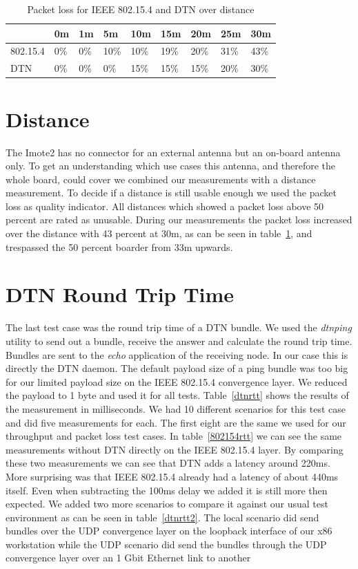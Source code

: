 \begin{table}
\begin{tabular}{lllllllll}
    & 0m & 1m & 5m & 10m & 15m & 20m & 25m & 30m \\
\hline
802.15.4 & 0\% & 0\% & 10\% & 10\% & 19\% & 20\% & 31\% & 43\% \\
DTN & 0\% & 0\% & 0\% & 15\% & 15\% & 15\% & 20\% & 30\% \\
\end{tabular}
\caption{Packet loss for IEEE 802.15.4 and DTN over distance}
\label{tableloss}
\end{table}

\section{Distance}
The Imote2 has no connector for an external antenna but an on-board antenna
only. To get an understanding which use cases this antenna, and therefore the
whole board, could cover we combined our measurements with a distance
measurement. To decide if a distance is still usable enough we used the
packet loss as quality indicator. All distances which showed a packet loss above
50 percent are rated as unusable. During our measurements the packet loss
increased over the distance with 43 percent at 30m, as can be seen in table~\ref{tableloss}, and trespassed the 50 percent boarder from 33m upwards.

\section{DTN Round Trip Time}
The last test case was the round trip time of a DTN bundle. We used the
\emph{dtnping} utility to send out a bundle, receive the answer and calculate
the round trip time. Bundles are sent to the \emph{echo} application of the
receiving node. In our case this is directly the DTN daemon. The default payload
size of a ping bundle was too big for our limited payload size on the IEEE
802.15.4 convergence layer. We reduced the payload to 1 byte and used it for all
tests. Table~\ref{dtnrtt} shows the results of the measurement in milliseconds. We
had 10 different scenarios for this test case and did five measurements for each.
The first eight are the same we used for our throughput and packet loss test cases.
In table~\ref{802154rtt} we can see the same measurements without DTN directly on
the IEEE 802.15.4 layer. By comparing these two measurements we can see that DTN
adds a latency around 220ms. More surprising was that IEEE 802.15.4 already had
a latency of about 440ms itself. Even when subtracting the 100ms delay we added
it is still more then expected. We added two more scenarios to compare it against
our usual test environment as can be seen in table~\ref{dtnrtt2}. The
local scenario did send bundles over the UDP convergence layer on the loopback
interface of our x86 workstation while the UDP scenario did send the bundles
through the UDP convergence layer over an 1 Gbit Ethernet link to another

